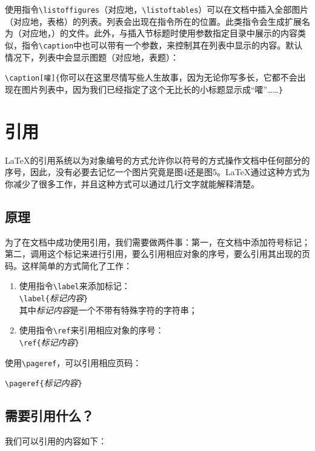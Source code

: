 使用指令\verb|\listoffigures|（对应地，\verb|\listoftables|）可以在文档中插入全部图片（对应地，表格）的列表。列表会出现在指令所在的位置。此类指令会生成扩展名为（对应地，）的文件。此外，与插入节标题时使用参数指定目录中展示的内容类似，指令\verb|\caption|中也可以带有一个参数，来控制其在列表中显示的内容。默认情况下，列表中会显示图题（对应地，表题）：

\begin{dmd}
\verb|\caption[嚯]{|你可以在这里尽情写些人生故事，因为无论你写多长，它都不会出现在图片列表中，因为我们已经指定了这个无比长的小标题显示成“嚯”……\verb|}|
\end{dmd}

\section{引用}

\LaTeX 的引用系统以为对象编号的方式允许你以符号的方式操作文档中任何部分的序号，因此，没有必要去记忆一个图片究竟是图4还是图5。\LaTeX 通过这种方式为你减少了很多工作，并且这种方式可以通过几行文字就能解释清楚。

\subsection{原理}

为了在文档中成功使用引用，我们需要做两件事：第一，在文档中添加符号标记；第二，调用这个标记来进行引用，要么引用相应对象的序号，要么引用其出现的页码。这样简单的方式简化了工作：

\begin{enumerate}
  \item 使用指令\verb|\label|来添加标记：\\
  \verb|\label{|\textsl{\<标记内容\>}\verb|}|\\
  其中\textsl{\<标记内容\>}是一个不带有特殊字符的字符串；
  \item 使用指令\verb|\ref|来引用相应对象的序号：\\
  \verb|\ref{|\textsl{\<标记内容\>}\verb|}|
\end{enumerate}

使用\verb|\pageref|，可以引用相应页码：

\verb|\pageref{|\textsl{\<标记内容\>}\verb|}|

\subsection{需要引用什么？}

我们可以引用的内容如下：

